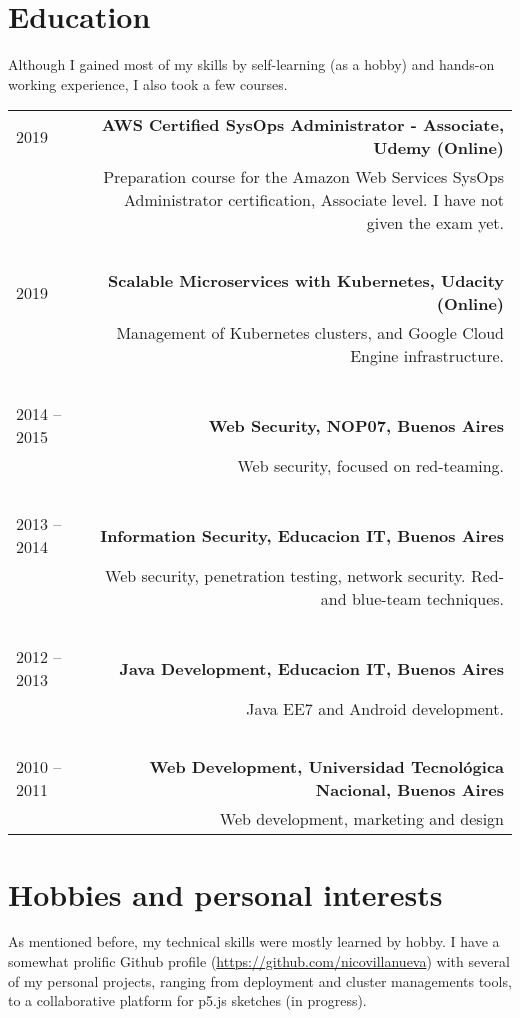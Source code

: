 \documentclass{vitae}
\begin{document}
\newpage

\section*{Education}
Although I gained most of my skills by self-learning (as a hobby) and hands-on working experience, I also took a few courses.

\begin{tabular}{L!{\VRule}R}
2019&{\bf AWS Certified SysOps Administrator - Associate, Udemy (Online)}\\
&Preparation course for the Amazon Web Services SysOps Administrator certification, Associate level. I have not given the exam yet.\\
~\\
2019&{\bf Scalable Microservices with Kubernetes, Udacity (Online)}\\
&Management of Kubernetes clusters, and Google Cloud Engine infrastructure.\\
~\\
2014 -- 2015&{\bf Web Security, NOP07, Buenos Aires}\\
&Web security, focused on red-teaming.\\
~\\
2013 -- 2014&{\bf Information Security, Educacion IT, Buenos Aires}\\
&Web security, penetration testing, network security. Red- and blue-team techniques.\\
~\\
2012 -- 2013&{\bf Java Development, Educacion IT, Buenos Aires}\\
&Java EE7 and Android development.\\
~\\
2010 -- 2011&{\bf Web Development, Universidad Tecnológica Nacional, Buenos Aires}\\
&Web development, marketing and design\\

\end{tabular}

\section*{Hobbies and personal interests}
As mentioned before, my technical skills were mostly learned by hobby. I have a somewhat prolific Github profile (\url{https://github.com/nicovillanueva}) with several of my personal projects, ranging from deployment and cluster managements tools, to a collaborative platform for p5.js sketches (in progress).
\end{document}
